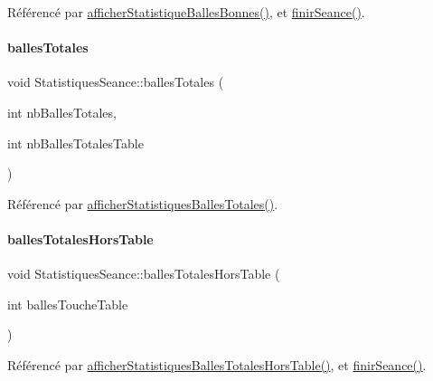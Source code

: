Référencé par \hyperlink{class_statistiques_seance_a712aad34b7ff7dd550ac6c976f75f416}{afficher\+Statistique\+Balles\+Bonnes()}, et \hyperlink{class_statistiques_seance_a72526ea18d6c534a1cb84576ef3ea28d}{finir\+Seance()}.

\mbox{\label{class_statistiques_seance_ac3c52002d12dd7b93e6339126c84190f}} 
\paragraph{\texorpdfstring{balles\+Totales}{ballesTotales}}
{\footnotesize\ttfamily void Statistiques\+Seance\+::balles\+Totales (\begin{DoxyParamCaption}\item[{int}]{nb\+Balles\+Totales,  }\item[{int}]{nb\+Balles\+Totales\+Table }\end{DoxyParamCaption})\hspace{0.3cm}{\ttfamily [signal]}}



Référencé par \hyperlink{class_statistiques_seance_a216b30bcfca71e425073a7ac90e59089}{afficher\+Statistiques\+Balles\+Totales()}.

\mbox{\label{class_statistiques_seance_a02a327f2a69eed4208b7b2076c6a67f2}} 
\paragraph{\texorpdfstring{balles\+Totales\+Hors\+Table}{ballesTotalesHorsTable}}
{\footnotesize\ttfamily void Statistiques\+Seance\+::balles\+Totales\+Hors\+Table (\begin{DoxyParamCaption}\item[{int}]{balles\+Touche\+Table }\end{DoxyParamCaption})\hspace{0.3cm}{\ttfamily [signal]}}



Référencé par \hyperlink{class_statistiques_seance_aebc6dad0ca5e4f99b08378077eae2c20}{afficher\+Statistiques\+Balles\+Totales\+Hors\+Table()}, et \hyperlink{class_statistiques_seance_a72526ea18d6c534a1cb84576ef3ea28d}{finir\+Seance()}.

